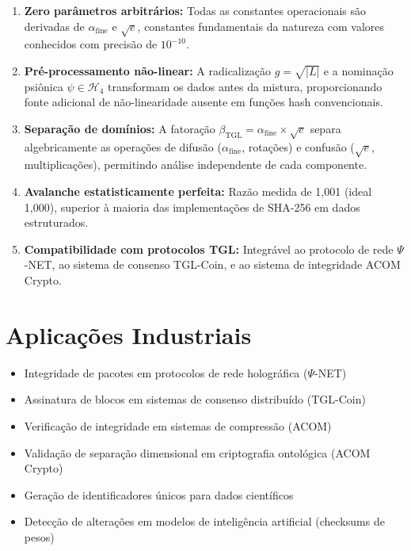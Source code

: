 \documentclass[12pt,a4paper]{article}
\newcommand{\betatgl}{\beta_{\!\scriptscriptstyle\mathrm{TGL}}}
\newcommand{\afine}{\alpha_{\mathrm{fine}}}
\begin{document}
\begin{enumerate}[nosep]
\item \textbf{Zero parâmetros arbitrários:} Todas as constantes operacionais são derivadas de $\afine$ e $\sqrt{e}$, constantes fundamentais da natureza com valores conhecidos com precisão de $10^{-10}$.
\item \textbf{Pré-processamento não-linear:} A radicalização $g = \sqrt{|L|}$ e a nominação psiônica $\psi \in \mathcal{H}_4$ transformam os dados antes da mistura, proporcionando fonte adicional de não-linearidade ausente em funções hash convencionais.
\item \textbf{Separação de domínios:} A fatoração $\betatgl = \afine \times \sqrt{e}$ separa algebricamente as operações de difusão ($\afine$, rotações) e confusão ($\sqrt{e}$, multiplicações), permitindo análise independente de cada componente.
\item \textbf{Avalanche estatisticamente perfeita:} Razão medida de 1,001 (ideal 1,000), superior à maioria das implementações de SHA-256 em dados estruturados.
\item \textbf{Compatibilidade com protocolos TGL:} Integrável ao protocolo de rede $\Psi$-NET, ao sistema de consenso TGL-Coin, e ao sistema de integridade ACOM Crypto.
\end{enumerate}

\section{Aplicações Industriais}

\begin{itemize}[nosep]
\item Integridade de pacotes em protocolos de rede holográfica ($\Psi$-NET)
\item Assinatura de blocos em sistemas de consenso distribuído (TGL-Coin)
\item Verificação de integridade em sistemas de compressão (ACOM)
\item Validação de separação dimensional em criptografia ontológica (ACOM Crypto)
\item Geração de identificadores únicos para dados científicos
\item Detecção de alterações em modelos de inteligência artificial (checksums de pesos)
\end{itemize}
\end{document}
